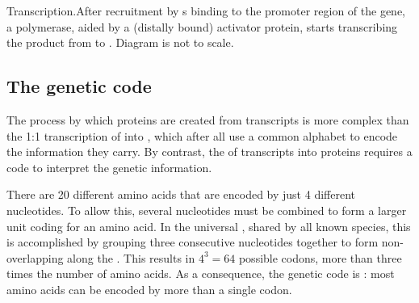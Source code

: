     {Transcription.}{After recruitment by s binding to the promoter
    region of the gene, a polymerase, aided by a (distally bound) activator
    protein, starts transcribing the  product from \fivep to \threep.
    Diagram is not to scale.}

\subsection{The genetic code}

The process by which proteins are created from \mrna transcripts is more complex
than the 1:1 transcription of \dna into \rna, which after all use a common
alphabet to encode the information they carry. By contrast, the
 of \mrna transcripts into proteins requires a code to
interpret the genetic information.

There are \num{20} different amino acids that are encoded by just \num{4}
different nucleotides. To allow this, several nucleotides must be combined to
form a larger unit coding for an amino acid. In the universal , shared by all known species, this is accomplished by grouping three
consecutive nucleotides together to form non-overlapping 
along the \mrna. This results in \(4^3 = 64\) possible codons, more than three
times the number of amino acids. As a consequence, the genetic code is
: most amino acids can be encoded by more than a single
codon.

